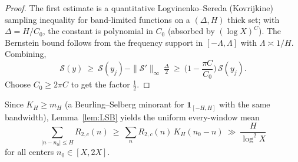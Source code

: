 \begin{proof}
The first estimate is a quantitative Logvinenko--Sereda (Kovrijkine) sampling inequality for band-limited functions on a $(\Delta,H)$ thick set; with $\Delta=H/C_0$, the constant is polynomial in $C_0$ (absorbed by $(\log X)^C$). The Bernstein bound follows from the frequency support in $[-\Lambda,\Lambda]$ with $\Lambda\asymp 1/H$. Combining,
\[
\mathcal S(y)\ \ge\ \mathcal S(y_j)-\|\mathcal S'\|_\infty\,\tfrac{\Delta}{2}\ \ge\ \Big(1-\frac{\pi C}{C_0}\Big)\,\mathcal S(y_j).
\]
Choose $C_0\ge 2\pi C$ to get the factor $\tfrac12$.
\end{proof}

Since $K_H\ge m_H$ (a Beurling--Selberg minorant for $\mathbf 1_{[-H,H]}$ with the same bandwidth), Lemma~\ref{lem:LSB} yields the uniform every-window mean
\[
\sum_{|n-n_0|\le H} R_{2,c}(n)\ \ge\ \sum_n R_{2,c}(n)\,K_H(n_0-n)\ \gg\ \frac{H}{\log^2 X}
\]
for all centers $n_0\in[X,2X]$.
